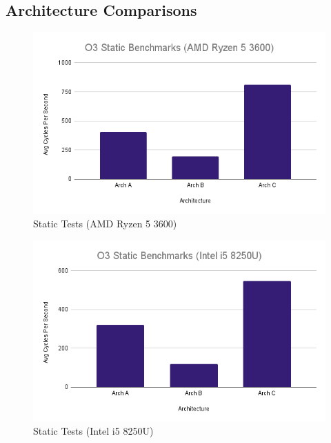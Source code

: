\documentclass{article}
\begin{document}
\subsection{Architecture Comparisons}
\label{arch_comparison}
\begin{figure}[!h]
\centering
\includegraphics[scale=0.5]{O3 Static Benchmarks (AMD Ryzen 5 3600).png}
\caption{Static Tests (AMD Ryzen 5 3600)}
\label{pc_static_tests}
\end{figure}

\begin{figure}[!h]
\centering
\includegraphics[scale=0.5]{O3 Static Benchmarks (Intel i5 8250U).png}
\caption{Static Tests (Intel i5 8250U)}
\label{laptop_static_tests}
\end{figure}
\end{document}
